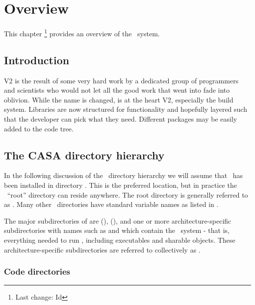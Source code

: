 \chapter{Overview}
\label{Overview}


This chapter \footnote{Last change:
$ $Id$ $}
provides an overview of the \casa\ system.

\section{Introduction}
\casa V2 is the result of some very hard work by a dedicated group of programmers
and scientists who would not let all the good work that went into \casa fade into
oblivion. While the name is changed, \casa is at the heart \casa V2, especially the
build system.  Libraries are now structured for functionality and hopefully layered
such that the developer can pick what they need.  Different packages may be easily
added to the code tree.



\section{The CASA directory hierarchy}
\label{Directories}

In the following discussion of the \casa\ directory hierarchy we will
assume that \casa\ has been installed in directory .  This
is the preferred location, but in practice the \casa\ ``root'' directory
can reside anywhere.  The root directory is generally referred to as
.  Many other \casa\ directories have standard variable
names as listed in .

The major subdirectories of  are  (),
 (), and one or more architecture-specific
subdirectories with names such as  and 
which contain the \casa\ system - that is, everything needed to run \casa,
including executables and sharable objects.  These architecture-specific
subdirectories are referred to collectively as .


\subsection{Code directories}
\label{Code directories}

